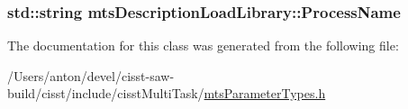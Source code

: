 \subsubsection[{Process\+Name}]{\setlength{\rightskip}{0pt plus 5cm}std\+::string mts\+Description\+Load\+Library\+::\+Process\+Name}\label{classmts_description_load_library_a4632a3ec13b1887b43383d2ee1e4c18f}


The documentation for this class was generated from the following file\+:\begin{DoxyCompactItemize}
\item 
/\+Users/anton/devel/cisst-\/saw-\/build/cisst/include/cisst\+Multi\+Task/\hyperlink{mts_parameter_types_8h}{mts\+Parameter\+Types.\+h}\end{DoxyCompactItemize}
